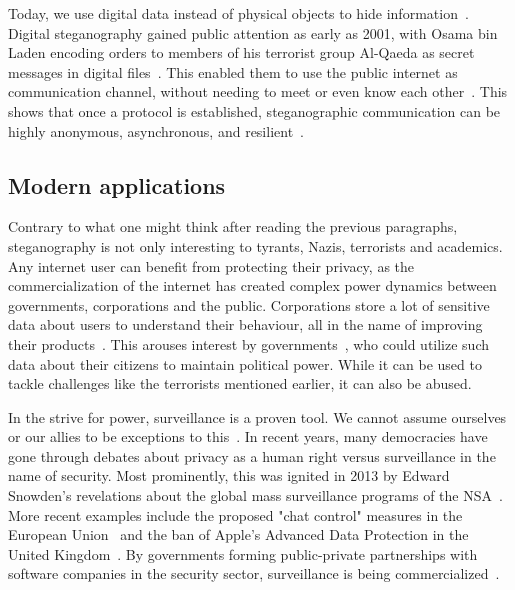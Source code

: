 Today, we use digital data instead of physical objects to hide information~\cite{bennettLinguisticSteganographySurvey2004}. Digital steganography gained public attention as early as 2001, with Osama bin Laden encoding orders to members of his terrorist group Al-Qaeda as secret messages in digital files~\cite{dembartEndUserHide2001,schneierTerroristsSteganography2001}. This enabled them to use the public internet as communication channel, without needing to meet or even know each other~\cite{schneierTerroristsSteganography2001}. This shows that once a protocol is established, steganographic communication can be highly anonymous, asynchronous, and resilient~\cite{schneierTerroristsSteganography2001}.

\subsection{Modern applications}
\label{sec:modernApplications}
Contrary to what one might think after reading the previous paragraphs, steganography is not only interesting to tyrants, Nazis, terrorists and academics. Any internet user can benefit from protecting their privacy, as the commercialization of the internet has created complex power dynamics between governments, corporations and the public. Corporations store a lot of sensitive data about users to understand their behaviour, all in the name of improving their products~\cite{duportailAskedTinderMy2017,titcombMillionsPeoplesDNA2025}. This arouses interest by governments~\cite{greenwaldNSAPrismProgram2013}, who could utilize such data about their citizens to maintain political power. While it can be used to tackle challenges like the terrorists mentioned earlier, it can also be abused.

In the strive for power, surveillance is a proven tool. We cannot assume ourselves or our allies to be exceptions to this~\cite{macaskillGCHQTapsFibreoptic2013}. In recent years, many democracies have gone through debates about privacy as a human right versus surveillance in the name of security. Most prominently, this was ignited in 2013 by Edward Snowden's revelations about the global mass surveillance programs of the \gls{NSA}~\cite{greenwaldEdwardSnowdenWhistleblower2013}. More recent examples include the proposed "chat control" measures in the European Union~\cite{danielChatControlEnd2024} and the ban of Apple's Advanced Data Protection in the United Kingdom~\cite{kleinmanUKGovernmentDemands2025,kleinmanApplePullsData2025}. By governments forming public-private partnerships with software companies in the security sector, surveillance is being commercialized~\cite{bbcPegasusSpywareSold2021,kasterPrivatizedEspionageNSO2023}.

